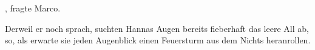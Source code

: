 \par

, fragte Marco. 

\par

Derweil er noch sprach, suchten Hannas Augen bereits fieberhaft das leere All ab, so, als erwarte sie jeden Augenblick einen Feuersturm aus dem Nichts heranrollen. 
